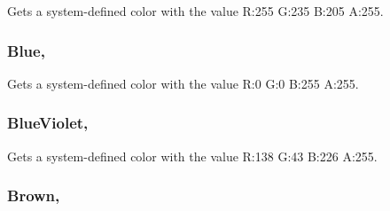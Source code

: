 Gets a system-\/defined color with the value R\+:255 G\+:235 B\+:205 A\+:255.

\hypertarget{structMicrosoft_1_1Xna_1_1Framework_1_1Color_aadbb3342531fbefd6e7ae00143f743eb}{}
\subsubsection[{Blue}]{ Blue\hspace{0.3cm}{\ttfamily [static]}, {\ttfamily [get]}}\label{structMicrosoft_1_1Xna_1_1Framework_1_1Color_aadbb3342531fbefd6e7ae00143f743eb}


Gets a system-\/defined color with the value R\+:0 G\+:0 B\+:255 A\+:255.

\hypertarget{structMicrosoft_1_1Xna_1_1Framework_1_1Color_a7b411efb5c5ec2f2660ba2d5cda346db}{}
\subsubsection[{Blue\+Violet}]{ Blue\+Violet\hspace{0.3cm}{\ttfamily [static]}, {\ttfamily [get]}}\label{structMicrosoft_1_1Xna_1_1Framework_1_1Color_a7b411efb5c5ec2f2660ba2d5cda346db}


Gets a system-\/defined color with the value R\+:138 G\+:43 B\+:226 A\+:255.

\hypertarget{structMicrosoft_1_1Xna_1_1Framework_1_1Color_ad8b56c943b8231708ed7090575586d39}{}
\subsubsection[{Brown}]{ Brown\hspace{0.3cm}{\ttfamily [static]}, {\ttfamily [get]}}\label{structMicrosoft_1_1Xna_1_1Framework_1_1Color_ad8b56c943b8231708ed7090575586d39}



